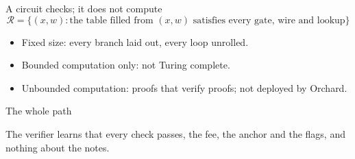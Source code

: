 \documentclass[aspectratio=169,11pt]{beamer}
\newcommand{\nfsym}{\ensuremath{\mathsf{nf}}}
\newcommand{\cmx}{\ensuremath{\mathsf{cmx}}}
\newcommand{\cvsym}{\ensuremath{\mathsf{cv}}}
\newcommand{\rksym}{\ensuremath{\mathsf{rk}}}
\newcommand{\ivk}{\ensuremath{\mathsf{ivk}}}
\newcommand{\epk}{\ensuremath{\mathsf{epk}}}
\newcommand{\rk}{\rksym}
\newcommand{\cvnet}{\cvsym^{\mathsf{net}}}
\newcommand{\Rel}{\mathcal{R}}
\begin{document}
\begin{frame}{A circuit checks; it does not compute}
\[
\Rel = \bigl\{(x, w) : \text{the table filled from } (x, w)
  \text{ satisfies every gate, wire and lookup}\bigr\}
\]
\vfill
\begin{itemize}\itemsep10pt
  \item Fixed size: every branch laid out, every loop unrolled.
  \item Bounded computation only: not Turing complete.
  \item Unbounded computation: proofs that verify proofs; not deployed by
    Orchard.
\end{itemize}
\vfill
\end{frame}

\begin{frame}{The whole path}
\begin{center}
\end{center}
\vfill
The verifier learns that every check passes, the fee, the anchor and the
flags, and nothing about the notes.
\end{frame}
\end{document}
